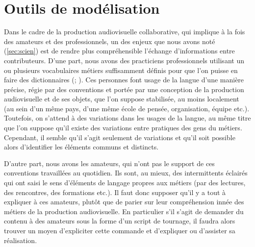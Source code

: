 \chapter{Outils de modélisation}\label{c:omod}
\minitoc


Dans le cadre de la production audiovisuelle collaborative, qui implique à la fois des amateurs et des professionnels, un des enjeux que nous avons noté (\ref{sec:scien}) est de rendre plus compréhensible l'échange d'informations entre contributeurs. 
D'une part, nous avons des practiciens professionnels utilisant un ou plusieurs vocabulaires métiers suffisamment définis pour que l'on puisse en faire des dictionnaires (\cite{Journot2008}; \cite{Pinel2008}). 
Ces personnes font usage de la langue d'une manière précise, régie par des conventions et portée par une conception de la production audiovisuelle et de ses objets, que l'on suppose stabilisée, au moins localement (au sein d'un même pays, d'une même école de pensée, organisation, équipe etc.).
Toutefois, on s'attend à des variations dans les usages de la langue, au même titre que l'on suppose qu'il existe des variations entre pratiques des gens du métiers.
Cependant, il semble qu'il s'agit seulement de variations et qu'il soit possible alors d'identifier les éléments communs et distincts.

D'autre part, nous avons les amateurs, qui n'ont pas le support de ces conventions travaillées au quotidien.
Ils sont, au mieux, des intermittents éclairés qui ont saisi le sens d'éléments de langage propres aux métiers (par des lectures, des rencontres, des formations etc.). 
Il faut donc supposer qu'il y a tout à expliquer à ces amateurs, plutôt que de parier sur leur compréhension innée des métiers de la production audiovisuelle.
En particulier s'il s'agit de demander du contenu à des amateurs sous la forme d'un script de tournage, il faudra alors trouver un moyen d'expliciter cette commande et d'expliquer ou d'assister sa réalisation. 

